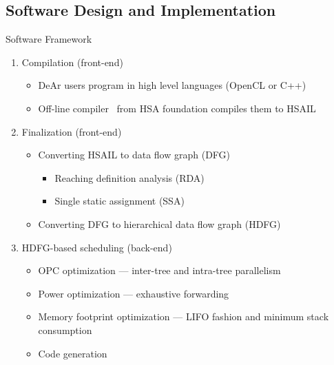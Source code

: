 \documentclass{beamer}
\begin{document}
\begin{CJK}{UTF8}{bkai}
    \subsection{Software Design and Implementation}
    \begin{frame}{Software Framework}
        \begin{enumerate}
            \item Compilation (front-end)
                \begin{itemize}
                    \item DeAr users program in high level languages (OpenCL or C++)
                    \item Off-line compiler~\cite{cloc} from HSA foundation compiles them to HSAIL
                \end{itemize}
            \item Finalization (front-end)
                \begin{itemize}
                    \item Converting HSAIL to data flow graph (DFG)
                        \begin{itemize}
                            \item Reaching definition analysis (RDA)
                            \item Single static assignment (SSA)
                        \end{itemize}
                    \item Converting DFG to hierarchical data flow graph (HDFG)
                \end{itemize}
            \item HDFG-based scheduling (back-end)
                \begin{itemize}
                    \item OPC optimization --- inter-tree and intra-tree parallelism
                    \item Power optimization --- exhaustive forwarding
                    \item Memory footprint optimization --- LIFO fashion and minimum stack consumption
                    \item Code generation
                \end{itemize}
        \end{enumerate}
    \end{frame}


\end{CJK}
\end{document}
